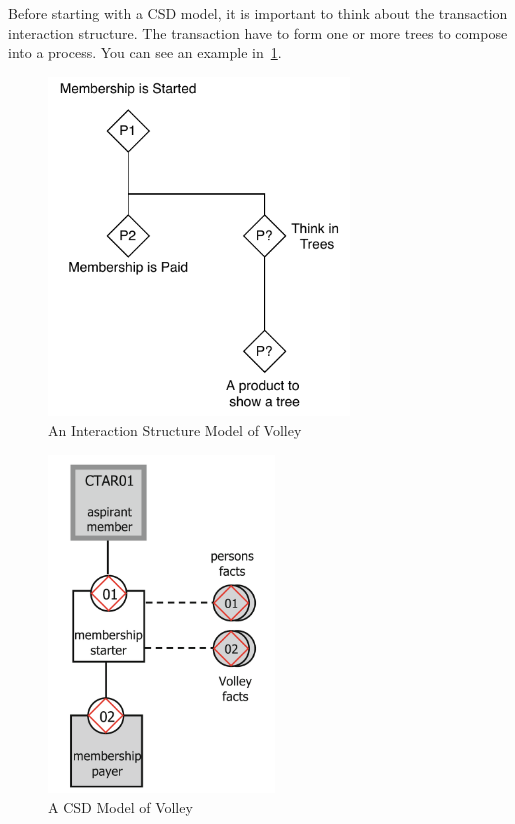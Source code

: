 Before starting with a CSD model, it is important to think about the transaction interaction structure. The transaction have to form one or more trees to compose into a process. You can see an example in~\cref{fig:interactionStructure}. 

\begin{figure}[h]\centering
	\includegraphics[width=8cm]{pic/VolleyInteractionStructure}
	\caption{An Interaction Structure Model of Volley}
	\label{fig:interactionStructure}
\end{figure}

\begin{figure}[h]\centering
	\includegraphics[width=6cm]{pic/VolleyCSD}
	\caption{A CSD Model of Volley~\cite{dietz2020enterprise}}
	\label{fig:csdModel}
\end{figure}

